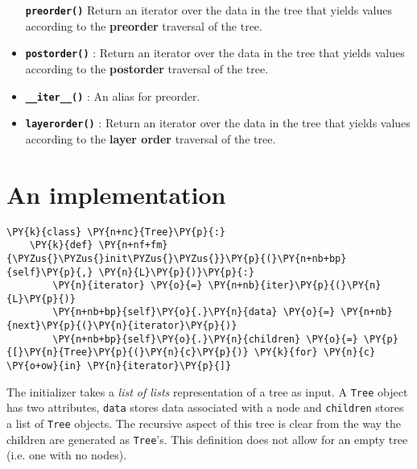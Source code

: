 \begin{itemize}
\textbf{\texttt{preorder()}} Return an iterator over the data in the tree that yields values according to the \textbf{preorder} traversal of the tree.



\item 

\textbf{\texttt{postorder()}} : Return an iterator over the data in the tree that yields values according to the \textbf{postorder} traversal of the tree.



\item 

\textbf{\texttt{\_\_iter\_\_()}} : An alias for preorder.



\item 

\textbf{\texttt{layerorder()}} : Return an iterator over the data in the tree that yields values according to the \textbf{layer order} traversal of the tree.



\end{itemize}
\section{An implementation}

\begin{Verbatim}[commandchars=\\\{\}]
\PY{k}{class} \PY{n+nc}{Tree}\PY{p}{:}
    \PY{k}{def} \PY{n+nf+fm}{\PYZus{}\PYZus{}init\PYZus{}\PYZus{}}\PY{p}{(}\PY{n+nb+bp}{self}\PY{p}{,} \PY{n}{L}\PY{p}{)}\PY{p}{:}
        \PY{n}{iterator} \PY{o}{=} \PY{n+nb}{iter}\PY{p}{(}\PY{n}{L}\PY{p}{)}
        \PY{n+nb+bp}{self}\PY{o}{.}\PY{n}{data} \PY{o}{=} \PY{n+nb}{next}\PY{p}{(}\PY{n}{iterator}\PY{p}{)}
        \PY{n+nb+bp}{self}\PY{o}{.}\PY{n}{children} \PY{o}{=} \PY{p}{[}\PY{n}{Tree}\PY{p}{(}\PY{n}{c}\PY{p}{)} \PY{k}{for} \PY{n}{c} \PY{o+ow}{in} \PY{n}{iterator}\PY{p}{]}
\end{Verbatim}



The initializer takes a \emph{list of lists} representation of a tree as input.  A \texttt{Tree} object has two attributes, \texttt{data} stores data associated with a node and \texttt{children} stores a list of \texttt{Tree} objects.
The recursive aspect of this tree is clear from the way the children are generated as \texttt{Tree}'s.  This definition does not allow for an empty tree (i.e. one with no nodes).


